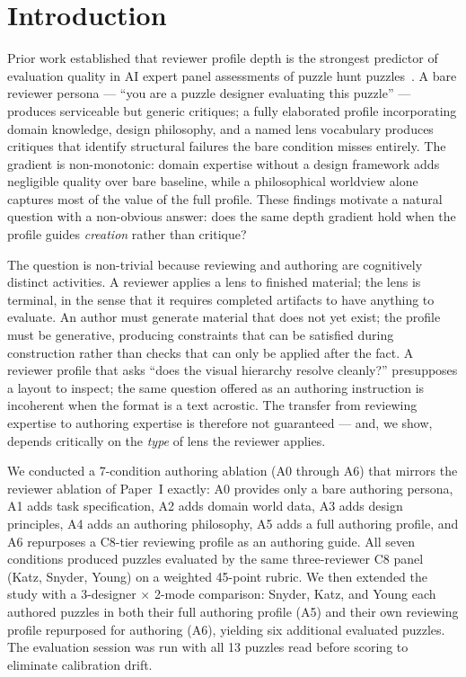 \section{Introduction}

Prior work established that reviewer profile depth is the strongest predictor of evaluation quality in AI expert panel assessments of puzzle hunt puzzles~\cite{paper1}. A bare reviewer persona — ``you are a puzzle designer evaluating this puzzle'' — produces serviceable but generic critiques; a fully elaborated profile incorporating domain knowledge, design philosophy, and a named lens vocabulary produces critiques that identify structural failures the bare condition misses entirely. The gradient is non-monotonic: domain expertise without a design framework adds negligible quality over bare baseline, while a philosophical worldview alone captures most of the value of the full profile. These findings motivate a natural question with a non-obvious answer: does the same depth gradient hold when the profile guides \emph{creation} rather than critique?

The question is non-trivial because reviewing and authoring are cognitively distinct activities. A reviewer applies a lens to finished material; the lens is terminal, in the sense that it requires completed artifacts to have anything to evaluate. An author must generate material that does not yet exist; the profile must be generative, producing constraints that can be satisfied during construction rather than checks that can only be applied after the fact. A reviewer profile that asks ``does the visual hierarchy resolve cleanly?'' presupposes a layout to inspect; the same question offered as an authoring instruction is incoherent when the format is a text acrostic. The transfer from reviewing expertise to authoring expertise is therefore not guaranteed — and, we show, depends critically on the \emph{type} of lens the reviewer applies.

We conducted a 7-condition authoring ablation (A0 through A6) that mirrors the reviewer ablation of Paper~I exactly: A0 provides only a bare authoring persona, A1 adds task specification, A2 adds domain world data, A3 adds design principles, A4 adds an authoring philosophy, A5 adds a full authoring profile, and A6 repurposes a C8-tier reviewing profile as an authoring guide. All seven conditions produced puzzles evaluated by the same three-reviewer C8 panel (Katz, Snyder, Young) on a weighted 45-point rubric. We then extended the study with a 3-designer $\times$ 2-mode comparison: Snyder, Katz, and Young each authored puzzles in both their full authoring profile (A5) and their own reviewing profile repurposed for authoring (A6), yielding six additional evaluated puzzles. The evaluation session was run with all 13 puzzles read before scoring to eliminate calibration drift.

